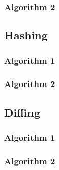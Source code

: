 \subsubsection{Algorithm 2}


\subsection{Hashing}


\subsubsection{Algorithm 1}

\subsubsection{Algorithm 2}


\subsection{Diffing}


\subsubsection{Algorithm 1}

\subsubsection{Algorithm 2}